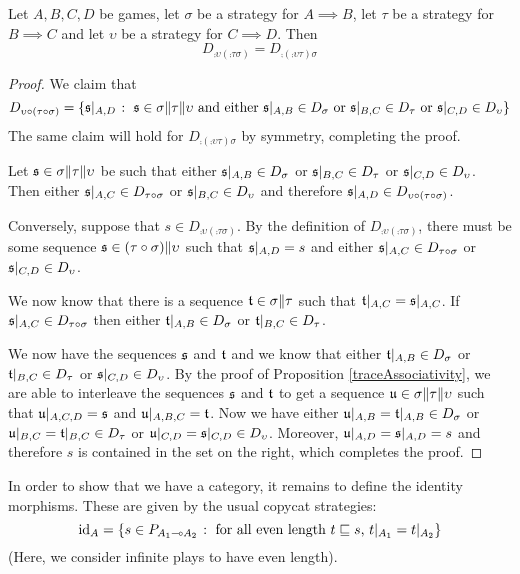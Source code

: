 \documentclass{article}
\begin{document}
\begin{proposition}
  Let $A,B,C,D$ be games, let $\sigma$ be a strategy for $A\implies B$, let $\tau$ be a strategy for $B\implies C$ and let $\upsilon$ be a strategy for $C\implies D$.  Then 
  \[
    D_{\comp\upsilon{(\comp\tau\sigma)}} = D_{\comp{(\comp\upsilon\tau)}\sigma}
    \]
  \begin{proof}
    We claim that
    \[
      D_{\upsilon \circ (\tau \circ \sigma)} = \{\mathfrak s\vert_{A,D}\;\colon\;\mathfrak s\in\sigma\|\tau\|\upsilon\textrm{ and either $\mathfrak s\vert_{A,B}\in D_\sigma$ or $\mathfrak s\vert_{B,C}\in D_\tau$ or $\mathfrak s\vert_{C,D}\in D_\upsilon$}\}
      \]
    The same claim will hold for $D_{\comp{(\comp\upsilon\tau)}\sigma}$ by symmetry, completing the proof.

    Let $\mathfrak s\in\sigma\|\tau\|\upsilon$ be such that either $\mathfrak s\vert_{A,B}\in D_\sigma$ or $\mathfrak s\vert_{B,C}\in D_\tau$ or $\mathfrak s\vert_{C,D}\in D_\upsilon$.  Then either $\mathfrak s\vert_{A,C}\in D_{\tau \circ \sigma}$ or $\mathfrak s\vert_{B,C}\in D_\upsilon$ and therefore $\mathfrak s\vert_{A,D}\in D_{\upsilon \circ (\tau \circ \sigma)}$.  

    Conversely, suppose that $s\in D_{\comp\upsilon{(\comp\tau\sigma)}}$.  By the definition of $D_{\comp\upsilon{(\comp\tau\sigma)}}$, there must be some sequence $\mathfrak s\in(\tau \circ \sigma)\|\upsilon$ such that $\mathfrak s\vert_{A,D}=s$ and either $\mathfrak s\vert_{A,C}\in D_{\tau \circ \sigma}$ or $\mathfrak s\vert_{C,D}\in D_\upsilon$.  

    We now know that there is a sequence $\mathfrak t\in\sigma\|\tau$ such that $\mathfrak t\vert_{A,C}=\mathfrak s\vert_{A,C}$.  If $\mathfrak s\vert_{A,C}\in D_{\tau \circ \sigma}$ then either $\mathfrak t\vert_{A,B}\in D_\sigma$ or $\mathfrak t\vert_{B,C}\in D_\tau$.  

    We now have the sequences $\mathfrak s$ and $\mathfrak t$ and we know that either $\mathfrak t\vert_{A,B}\in D_\sigma$ or $\mathfrak t\vert_{B,C}\in D_\tau$ or $\mathfrak s\vert_{C,D}\in D_\upsilon$.  By the proof of Proposition \ref{traceAssociativity}, we are able to interleave the sequences $\mathfrak s$ and $\mathfrak t$ to get a sequence $\mathfrak u\in\sigma\|\tau\|\upsilon$ such that $\mathfrak u\vert_{A,C,D}=\mathfrak s$ and $\mathfrak u\vert_{A,B,C}=\mathfrak t$.  Now we have either $\mathfrak u\vert_{A,B}=\mathfrak t\vert_{A,B}\in D_\sigma$ or $\mathfrak u\vert_{B,C}=\mathfrak t\vert_{B,C}\in D_\tau$ or $\mathfrak u\vert_{C,D}=\mathfrak s\vert_{C,D}\in D_\upsilon$.  Moreover, $\mathfrak u\vert_{A,D}=\mathfrak s\vert_{A,D}=s$ and therefore $s$ is contained in the set on the right, which completes the proof.
  \end{proof}
\end{proposition}

In order to show that we have a category, it remains to define the identity morphisms.  These are given by the usual copycat strategies:
\[
  \operatorname{id}_A = \{s\in P_{A_1\multimap A_2}\;\colon\;\textrm{for all even length $t\sqsubseteq s$, $t\vert_{A_1}=t\vert_{A_2}$}\}
  \]
(Here, we consider infinite plays to have even length).
\end{document}

